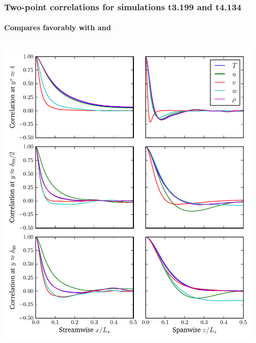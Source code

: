 \documentclass[mathserif]{beamer}
\begin{document}
\begin{frame}
    \frametitle{Two-point correlations for simulations t3.199 and t4.134}
    \framesubtitle{Compares favorably with \citet{Coleman1995Numerical} and \citet{Guarini2000Direct}}
    \begin{columns}
        \begin{column}{0.5\linewidth}
          \includegraphics[width=\textwidth]{autocorr-turb3199}
        \end{column}
        \begin{column}{0.5\linewidth}

\end{column}
\end{columns}
\end{frame}
\end{document}
